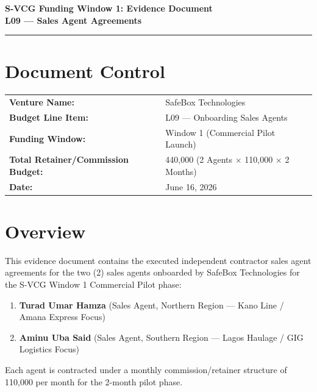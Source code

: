 \documentclass[11pt,a4paper]{article}
\begin{document}
\begin{center}
    {\LARGE \textbf{S-VCG Funding Window 1: Evidence Document}} \\
    \vspace{0.2cm}
    {\large \textbf{L09 --- Sales Agent Agreements}} \\
    \vspace{0.1cm}
    \rule{\linewidth}{1pt}
\end{center}

\vspace{0.2cm}

\section*{Document Control}
\begin{tabular}{ll}
    \textbf{Venture Name:} & SafeBox Technologies \\
    \textbf{Budget Line Item:} & L09 --- Onboarding Sales Agents \\
    \textbf{Funding Window:} & Window 1 (Commercial Pilot Launch) \\
    \textbf{Total Retainer/Commission Budget:} & \text{₦}440,000 (2 Agents $\times$ \text{₦}110,000 $\times$ 2 Months) \\
    \textbf{Date:} & June 16, 2026 \\
\end{tabular}

\vspace{0.5cm}

\section{Overview}
This evidence document contains the executed independent contractor sales agent agreements for the two (2) sales agents onboarded by SafeBox Technologies for the S-VCG Window 1 Commercial Pilot phase:
\begin{enumerate}
    \item \textbf{Turad Umar Hamza} (Sales Agent, Northern Region --- Kano Line / Amana Express Focus)
    \item \textbf{Aminu Uba Said} (Sales Agent, Southern Region --- Lagos Haulage / GIG Logistics Focus)
\end{enumerate}

Each agent is contracted under a monthly commission/retainer structure of 110,000 per month for the 2-month pilot phase.

\newpage
\end{document}
